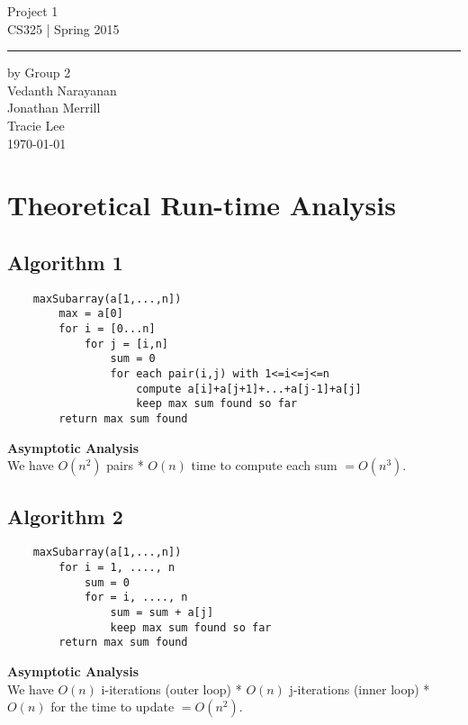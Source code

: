 \documentclass[11pt,letterpaper]{article}
\begin{document}
\begin{titlepage}
    \vspace*{4cm}
    \begin{flushright}
    {\huge
        Project 1\\[5mm]
    }
    {\large
        CS325 | Spring 2015
     }
    \end{flushright}
\hrule
    \begin{flushright}
	by Group 2\\
	Vedanth Narayanan\\
	Jonathan Merrill\\
	Tracie Lee\\
    \vfill
	\today\\
    \end{flushright}
\end{titlepage}

\raggedright

\section{Theoretical Run-time Analysis}

\subsection{Algorithm 1}
\begin{verbatim}
    maxSubarray(a[1,...,n])
        max = a[0]
        for i = [0...n]
	        for j = [i,n]
		        sum = 0
		        for each pair(i,j) with 1<=i<=j<=n
			        compute a[i]+a[j+1]+...+a[j-1]+a[j]
			        keep max sum found so far
        return max sum found
\end{verbatim}
\textbf{Asymptotic Analysis}\\
We have $O(n^2)$ pairs * $O(n)$ time to compute each sum $= O(n^3)$.

\subsection{Algorithm 2}
\begin{verbatim}
    maxSubarray(a[1,...,n])
        for i = 1, ...., n
            sum = 0
            for = i, ...., n
                sum = sum + a[j]
                keep max sum found so far
        return max sum found
\end{verbatim}
\textbf{Asymptotic Analysis}\\
We have $O(n)$ i-iterations (outer loop) * $O(n)$ j-iterations (inner loop) * $O(n)$ for the time to update $= O(n^2)$.
\end{document}
